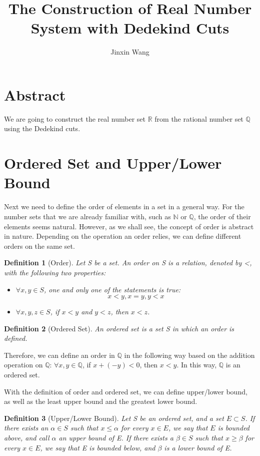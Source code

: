 \documentclass{article}
\title{The Construction of Real Number System with Dedekind Cuts}
\author{Jinxin Wang}
\date{}
\newtheorem{definition}{Definition}[section]
\begin{document}
\maketitle

\section{Abstract}

We are going to construct the real number set $\mathbb{R}$ from the rational 
number set $\mathbb{Q}$ using the Dedekind cuts.

\section{Ordered Set and Upper/Lower Bound}

Next we need to define the order of elements in a set in a general way. For the
number sets that we are already familiar with, such as $\mathbb{N}$ or 
$\mathbb{Q}$, the order of their elements seems natural. However, as we shall 
see, the concept of order is abstract in nature. Depending on the operation an 
order relies, we can define different orders on the same set.

\begin{definition}[Order]
  Let S be a set. An order on S is a relation, denoted by <, with the following 
  two properties:
  \begin{itemize}
    \item $\forall x, y \in S$, one and only one of the statements is true:
    \[
      x < y, x = y, y < x
    \]
    \item $\forall x, y, z \in S$, if $x < y$ and $y < z$, then $x < z$.
  \end{itemize}
\end{definition}

\begin{definition}[Ordered Set]
  An ordered set is a set S in which an order is defined.
\end{definition}

Therefore, we can define an order in $\mathbb{Q}$ in the following way based on 
the addition operation on $\mathbb{Q}$: $\forall x, y \in \mathbb{Q}$, if 
$x + (-y) < 0$, then $x < y$. In this way, $\mathbb{Q}$ is an ordered set.

With the definition of order and ordered set, we can define upper/lower bound, 
as well as the least upper bound and the greatest lower bound.

\begin{definition}[Upper/Lower Bound]
  Let S be an ordered set, and a set $E \subset S$. If there exists an 
  $\alpha \in S$ such that $x \leq \alpha$ for every $x \in E$, we say that $E$ 
  is bounded above, and call $\alpha$ an upper bound of E. If there exists a 
  $\beta \in S$ such that $x \geq \beta$ for every $x \in E$, we say that E is 
  bounded below, and $\beta$ is a lower bound of E.
\end{definition}
\end{document}
